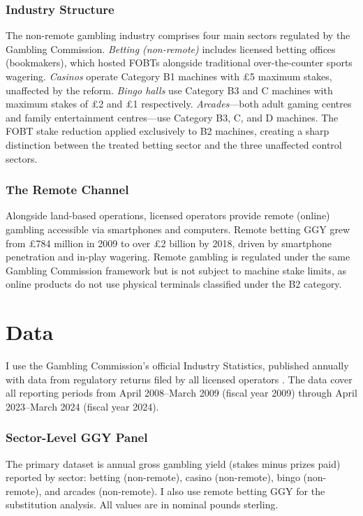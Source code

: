 \documentclass[12pt]{article}
\begin{document}
\subsubsection*{Industry Structure} The non-remote gambling industry comprises four main sectors regulated by the Gambling Commission. \textit{Betting (non-remote)} includes licensed betting offices (bookmakers), which hosted FOBTs alongside traditional over-the-counter sports wagering. \textit{Casinos} operate Category B1 machines with \pounds 5 maximum stakes, unaffected by the reform. \textit{Bingo halls} use Category B3 and C machines with maximum stakes of \pounds 2 and \pounds 1 respectively. \textit{Arcades}---both adult gaming centres and family entertainment centres---use Category B3, C, and D machines. The FOBT stake reduction applied exclusively to B2 machines, creating a sharp distinction between the treated betting sector and the three unaffected control sectors.

\subsubsection*{The Remote Channel} Alongside land-based operations, licensed operators provide remote (online) gambling accessible via smartphones and computers. Remote betting GGY grew from \pounds 784 million in 2009 to over \pounds 2 billion by 2018, driven by smartphone penetration and in-play wagering. Remote gambling is regulated under the same Gambling Commission framework but is not subject to machine stake limits, as online products do not use physical terminals classified under the B2 category.

\section{Data}

I use the Gambling Commission's official Industry Statistics, published annually with data from regulatory returns filed by all licensed operators \citep{gambling_commission_2024}. The data cover all reporting periods from April 2008--March 2009 (fiscal year 2009) through April 2023--March 2024 (fiscal year 2024).

\subsubsection*{Sector-Level GGY Panel} The primary dataset is annual gross gambling yield (stakes minus prizes paid) reported by sector: betting (non-remote), casino (non-remote), bingo (non-remote), and arcades (non-remote). I also use remote betting GGY for the substitution analysis. All values are in nominal pounds sterling.
\end{document}
